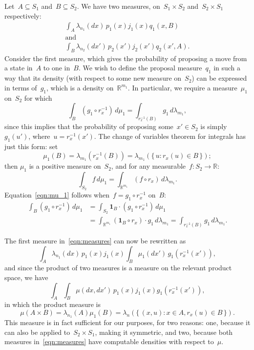 \documentclass[11pt,a4paper]{article}
\newcommand\mb[1]{\mathbb{#1}}                   %
\theoremstyle{definition}
\begin{document}
Let~$A \subseteq S_1$ and~$B \subseteq S_2$. We have two measures, on~$S_1
\times S_2$ and~$S_2 \times S_1$ respectively:
\begin{equation}\label{eqn:measures}
\begin{gathered}
  \int_A \lambda_{n_1}(dx)\,p_1(x)j_1(x) q_1(x,B) \\
    \text{and} \\ \int_B \lambda_{n_2}(dx')\,p_2(x')j_2(x') q_2(x',A).
\end{gathered}
\end{equation}
Consider the first measure, which gives the probability of proposing a move from
a state in~$A$ to one in~$B$. We wish to define the proposal measure~$q_1$ in
such a way that its density (with respect to some new measure on~$S_2$) can be
expressed in terms of~$g_1$, which is a density on~$\mb{R}^{m_1}$. In
particular, we require a measure~$\mu_1$ on~$S_2$ for which
\begin{equation}\label{eqn:mu_1}
  \int_B (g_1 \circ r_x^{-1})\,d\mu_1 = \int_{r_x^{-1}(B)} g_1\,d\lambda_{m_1},
\end{equation}
since this implies that the probability of proposing some~$x' \in S_2$ is
simply~$g_1(u')$, where~$u = r_x^{-1}(x')$. The change of variables theorem for
integrals has just this form: set
\[ \mu_1(B) = \lambda_{m_1}(r_x^{-1}(B))
  = \lambda_{m_1}(\{\, u : r_x(u) \in B \,\}); \]
then $\mu_1$ is a positive measure on~$S_2$, and for any measurable~$f\colon S_2
\to \mb{R}$:
\[ \int_{S_2} f\,d\mu_1 = \int_{\mb{R}^{m_1}} (f \circ r_x)\,d\lambda_{m_1}. \]
Equation~\ref{eqn:mu_1} follows when~$f = g_1 \circ r_x^{-1}$ on~$B$:
\begin{align*}
  \int_B (g_1 \circ r_x^{-1})\,d\mu_1
    &= \int_{S_2} \symbf{1}_B \cdot (g_1 \circ r_x^{-1})\,d\mu_1 \\
    &= \int_{\mb{R}^{m_1}} (\symbf{1}_B \circ r_x) \cdot g_1\,d\lambda_{m_1}
    = \int_{r_x^{-1}(B)} g_1\,d\lambda_{m_1}.
\end{align*}

The first measure in~\eqref{eqn:measures} can now be rewritten as
\begin{equation}\label{eqn:measure 1}
  \int_A \lambda_{n_1}(dx)\,p_1(x)j_1(x)
      \int_B \mu_1(dx')\,g_1(r_x^{-1}(x')),
\end{equation}
and since the product of two measures is a measure on the relevant product
space, we have
\[ \int_A \int_B \mu(dx,dx')\,p_1(x)j_1(x)g_1(r_x^{-1}(x')), \]
in which the product measure is
\[ \mu(A \times B) = \lambda_{n_1}(A)\mu_1(B)
  = \lambda_n(\{\, (x,u) : x \in A, r_x(u) \in B \,\}). \]
This measure is in fact sufficient for our purposes, for two reasons: one,
because it can also be applied to~$S_2 \times S_1$, making it symmetric, and
two, because both measures in~\eqref{eqn:measures} have computable densities
with respect to~$\mu$.
\end{document}
